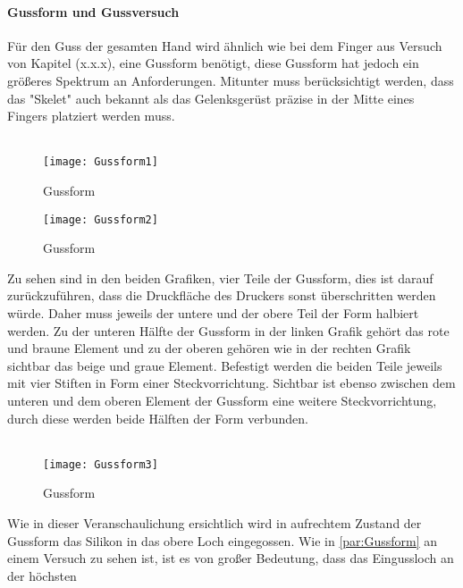 \documentclass[titlepage,12pt,twoside]{article}
\begin{document}
\paragraph{Gussform und Gussversuch}
\hfill \break
\hfill \break
Für den Guss der gesamten Hand wird ähnlich wie bei dem Finger aus Versuch von Kapitel (x.x.x), eine Gussform benötigt, diese Gussform hat jedoch ein größeres Spektrum an Anforderungen. Mitunter muss berücksichtigt werden, dass das "Skelet" auch 
bekannt als das Gelenksgerüst präzise in der Mitte eines Fingers platziert werden muss. \\
\\
\begin{figure}[H]
	\begin{center}
		\scalebox{1.2}
		{\texttt{[image: Gussform1]}}
		\caption{Gussform}
		\label{fig:Gussform1}			
	\end{center}
\end{figure}
\begin{figure}[H]
	\begin{center}
		\scalebox{1.2}
		{\texttt{[image: Gussform2]}}
		\caption{Gussform}
		\label{fig:Gussform2}			
	\end{center}
\end{figure}
\hfill \break
Zu sehen sind in den beiden Grafiken, vier Teile der Gussform, dies ist darauf zurückzuführen, dass die Druckfläche des Druckers sonst überschritten werden würde. Daher muss jeweils der untere und der obere Teil der Form halbiert werden. Zu der 
unteren Hälfte der Gussform in der linken Grafik gehört das rote und braune Element und zu der oberen gehören wie in der rechten Grafik sichtbar das beige und graue Element. Befestigt werden die beiden Teile jeweils mit vier Stiften in Form einer 
Steckvorrichtung. Sichtbar ist ebenso zwischen dem unteren und dem oberen Element der Gussform eine weitere Steckvorrichtung, durch diese werden beide Hälften der Form verbunden. \\
\\
\begin{figure}[H]
	\begin{center}
		\scalebox{1.2}
		{\texttt{[image: Gussform3]}}
		\caption{Gussform}
		\label{fig:Gussform3}			
	\end{center}
\end{figure}
\hfill \break
Wie in dieser Veranschaulichung ersichtlich wird in aufrechtem Zustand der Gussform das Silikon in das obere Loch eingegossen. Wie in \autoref{par:Gussform} an einem Versuch zu sehen ist, ist es von großer Bedeutung, dass das Eingussloch an der höchsten 
\end{document}
